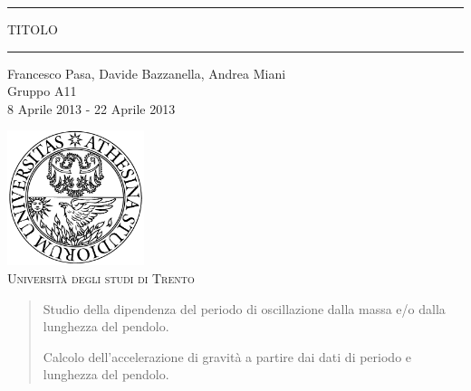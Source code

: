 \begin{titlepage}
\begin{center}

	\hrule \vspace{0.5cm}
     	\textsc{\LARGE TITOLO}
	\vspace{0.5cm} \hrule \vspace{2cm}

      	{\large Francesco Pasa, Davide Bazzanella, Andrea Miani\\
		Gruppo A11}\\
	\vspace{0.5cm}
      	{\large 8 Aprile 2013 - 22 Aprile 2013}
	\vfill

	\includegraphics[width=4cm]{unitn_logo.png}\\
	\vspace{1cm}
        \textsc{\Large Università degli studi di Trento}
	\vfill

	{\begin{abstract}
Studio della dipendenza del periodo di oscillazione dalla massa e/o dalla lunghezza del pendolo.

Calcolo dell'accelerazione di gravità a partire dai dati di periodo e lunghezza del pendolo.
	 \end{abstract}}
\end{center}
\end{titlepage}
